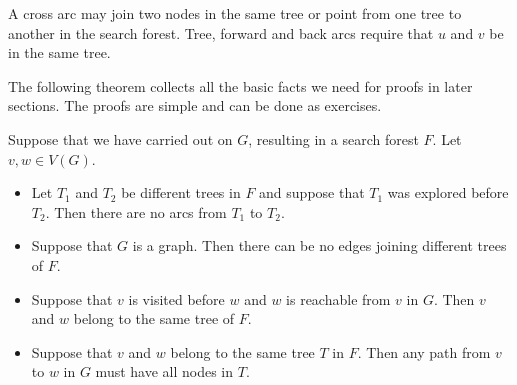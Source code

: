 A cross arc may 
join two nodes in the same tree or point from one tree to another in the search forest. Tree, forward and back arcs require that $u$ and $v$ be in the same tree.





The following theorem collects all the basic facts we need for proofs
in later sections. The proofs are simple and can be done as exercises. %

\begin{Theorem}
\label{thm:trav}
Suppose that we have carried out  on $G$, 
resulting in a search forest $F$. Let $v, w \in V(G)$.
\begin{itemize}
\item Let $T_1$ and $T_2$ be different trees in $F$ and suppose that $T_1$ was 
explored before $T_2$. Then there are no arcs from $T_1$ to $T_2$. 

\item Suppose that $G$ is a graph. Then there can be no edges joining different 
trees of $F$.

\item Suppose that $v$ is visited before $w$ and $w$ is reachable from $v$ in 
$G$. Then $v$ and $w$ belong to the same tree of $F$.

\item Suppose that $v$ and $w$ belong to the same tree $T$ in $F$. Then any path
 from $v$ to $w$ in $G$ must have all nodes in $T$.
\end{itemize}
\end{Theorem}

